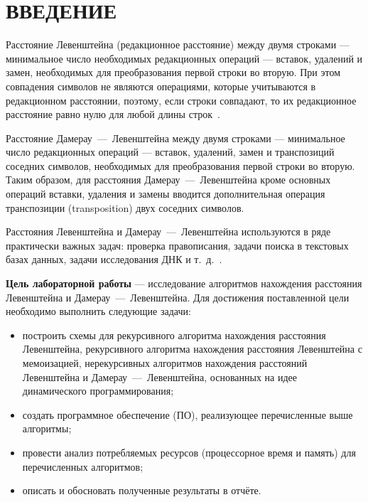 \chapter*{ВВЕДЕНИЕ}

Расстояние Левенштейна (редакционное расстояние) между двумя строками --- минимальное число необходимых редакционных операций --- вставок, удалений и замен, необходимых для преобразования первой строки во вторую. При этом совпадения символов не являются операциями, которые учитываются в
редакционном расстоянии, поэтому, если строки совпадают, то их редакционное
расстояние равно нулю для любой длины строк~\cite{ulianov}. 

Расстояние Дамерау~---~Левенштейна между двумя строками --- минимальное число редакционных операций --- вставок, удалений, замен и транспозиций соседних символов, необходимых для преобразования первой строки во вторую. Таким образом, для расстояния Дамерау~---~Левенштейна кроме основных операций вставки, удаления и замены вводится дополнительная операция транспозиции (transposition) двух соседних символов.

Расстояния Левенштейна и Дамерау~---~Левенштейна используются в ряде практически важных задач: проверка правописания, задачи поиска в текстовых базах данных, задачи исследования ДНК и т.~д.~\cite{ulianov}.

\textbf{Цель лабораторной работы} --- исследование алгоритмов нахождения расстояния Левенштейна и Дамерау~---~Левенштейна. Для достижения поставленной цели необходимо выполнить следующие задачи:

\begin{itemize}[label=--]
    \item построить схемы для рекурсивного алгоритма нахождения расстояния Левенштейна, рекурсивного алгоритма нахождения расстояния Левенштейна с мемоизацией, нерекурсивных алгоритмов нахождения расстояний Левенштейна и Дамерау~---~Левенштейна, основанных на идее динамического программирования;
    \item создать программное обеспечение (ПО), реализующее перечисленные выше алгоритмы;
    \item провести анализ потребляемых ресурсов (процессорное время и память) для перечисленных алгоритмов;
    \item описать и обосновать полученные результаты в отчёте.
\end{itemize}
